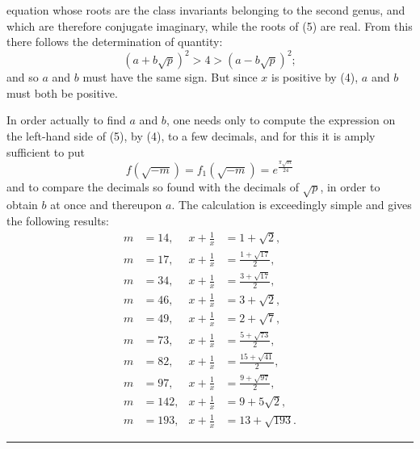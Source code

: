 equation whose roots are the class invariants belonging to the second genus, and which are therefore conjugate imaginary, while the roots of (5) are real. From this there follows the determination of quantity:
\[
(a+b\sqrt p)^2 > 4 > (a-b\sqrt p)^2;
\]
and so $a$ and $b$ must have the same sign. But since $x$ is positive by (4), $a$ and $b$ must both be positive.

In order actually to find $a$ and $b$, one needs only to compute the expression on the left-hand side of (5), by (4), to a few decimals, and for this it is amply sufficient to put
\[
f(\sqrt{-m}) = f_1(\sqrt{-m}) = e^{\frac{\pi\sqrt m}{24}}
\]
and to compare the decimals so found with the decimals of $\sqrt p$, in order to obtain $b$ at once and thereupon $a$. The calculation is exceedingly simple and gives the following results:
\[
\begin{aligned}
m &= 14, & x + \frac1x &= 1 + \sqrt2,\\
m &= 17, & x + \frac1x &= \frac{1+\sqrt{17}}{2},\\
m &= 34, & x + \frac1x &= \frac{3+\sqrt{17}}{2},\\
m &= 46, & x + \frac1x &= 3 + \sqrt2,\\
m &= 49, & x + \frac1x &= 2 + \sqrt7,\\
m &= 73, & x + \frac1x &= \frac{5+\sqrt{73}}{2},\\
m &= 82, & x + \frac1x &= \frac{15+\sqrt{41}}{2},\\
m &= 97, & x + \frac1x &= \frac{9+\sqrt{97}}{2},\\
m &= 142, & x + \frac1x &= 9 + 5\sqrt2,\\
m &= 193, & x + \frac1x &= 13 + \sqrt{193}.
\end{aligned}
\]

\begin{center}\rule{3cm}{0.4pt}\end{center}
